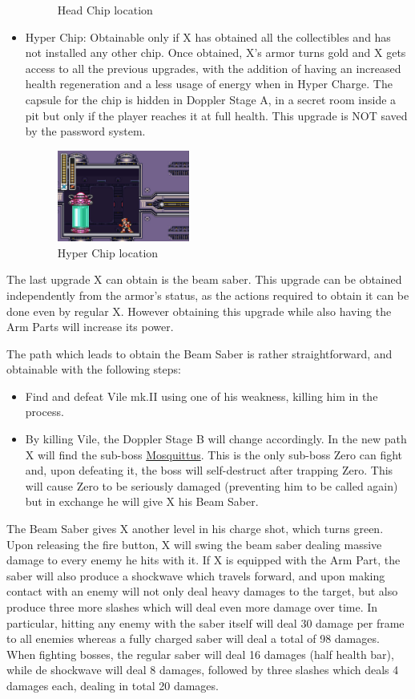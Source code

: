 \begin{itemize}
\begin{figure}[htp]
		\caption{Head Chip location}
	\end{figure}
	\item Hyper Chip: Obtainable only if X has obtained all the collectibles and has not installed any other chip. Once obtained, X's armor turns gold and X gets access to all the previous upgrades, with the addition of having an increased health regeneration and a less usage of energy when in Hyper Charge. The capsule for the chip is hidden in Doppler Stage A, in a secret room inside a pit but only if the player reaches it at full health. This upgrade is NOT saved by the password system. 
	\begin{figure}[htp] %
		\centering
		\includegraphics[height=3cm]{figures/X3/Doppler_stages/Hyper_chip.png}
		\caption{Hyper Chip location}
	\end{figure}
\end{itemize}

The last upgrade X can obtain is the beam saber. This upgrade can be obtained independently from the armor's status, as the actions required to obtain it can be done even by regular X. However obtaining this upgrade while also having the Arm Parts will increase its power.

The path which leads to obtain the Beam Saber is rather straightforward, and obtainable with the following steps:
\begin{itemize}
	\item Find and defeat Vile mk.II using one of his weakness, killing him in the process.
	\item By killing Vile, the Doppler Stage B will change accordingly. In the new path X will find the sub-boss  \hyperlink{miniboss:Mosquittus}{Mosquittus}. This is the only sub-boss Zero can fight and, upon defeating it, the boss will self-destruct after trapping Zero. This will cause Zero to be seriously damaged (preventing him to be called again) but in exchange he will give X his Beam Saber.
\end{itemize} 
The Beam Saber gives X another level in his charge shot, which turns green. Upon releasing the fire button, X will swing the beam saber dealing massive damage to every enemy he hits with it. If X is equipped with the Arm Part, the saber will also produce a shockwave which travels forward, and upon making contact with an enemy will not only deal heavy damages to the target, but also produce three more slashes which will deal even more damage over time. In particular, hitting any enemy with the saber itself will deal 30 damage per frame to all enemies whereas a fully charged saber will deal a total of 98 damages. When fighting bosses, the regular saber will deal 16 damages (half health bar), while de shockwave will deal 8 damages, followed by three slashes which deals 4 damages each, dealing in total 20 damages.

